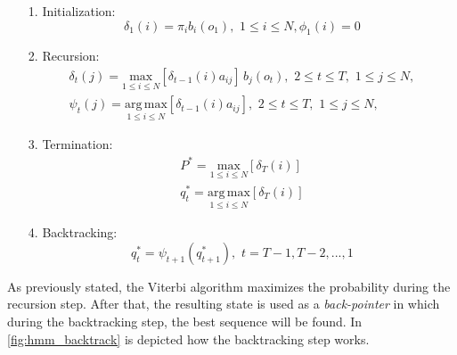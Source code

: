 \begin{itemize}
	\item[1.]{Initialization:} \\
	\begin{equation}
		\delta_{1}(i) = \pi_{i}b_{i}(o_{1}), \,\, 1 \leq i \leq N, \phi_{1}(i) = 0
	\end{equation}

	\item[2.]{Recursion:} \\
	\begin{subequations}
		\begin{align}
		\delta_{t}(j) = \underset{1\leq i \leq N}{\mathrm{max}} [\delta_{t-1}(i)a_{ij}] \, b_{j}(o_{t}), \,\, 2 \leq t \leq T, \,\, 1 \leq j \leq N, \\
		\psi_{t}(j) = \underset{1\leq i \leq N}{\mathrm{arg \, max}} [\delta_{t-1}(i)a_{ij}], \,\, 2 \leq t \leq T, \,\, 1 \leq j \leq N,
		\end{align}
	\end{subequations}

	\item[3.]{Termination:} \\
	\begin{subequations}
		\begin{align}
		P^{*} = \underset{1\leq i \leq N}{\mathrm{max}}[\delta_{T}(i)] \\
		q_{t}^{*} = \underset{1\leq i \leq N}{\mathrm{arg \, max}}[\delta_{T}(i)]
		\end{align}
	\end{subequations}

	\item[4.]{Backtracking:} \\
	\begin{equation}
		q_{t}^{*} = \psi_{t+1}(q_{t+1}^{*}), \,\, t = T - 1, T - 2, ... , 1
	\end{equation}
\end{itemize}

\noindent As previously stated, the Viterbi algorithm maximizes the probability during the recursion step. After that, the resulting state is used as a \textit{back-pointer} in which during the backtracking step, the best sequence will be found. In \ref{fig:hmm_backtrack} is depicted how the backtracking step works.

